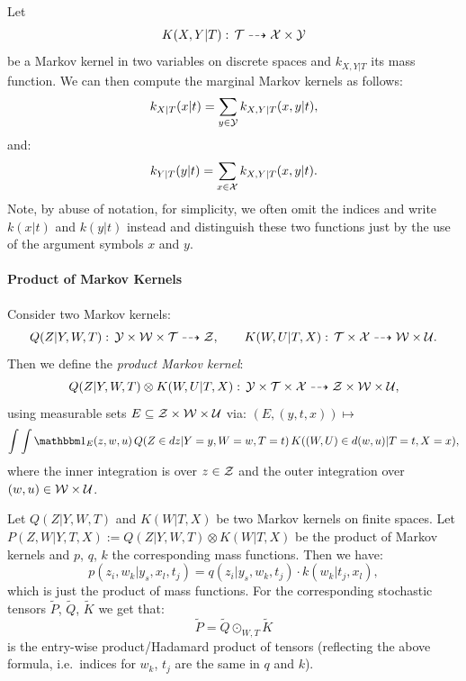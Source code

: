 \begin{Eg}
    Let 
    \[K(X,Y|T):\,\mathcal{T} \dashrightarrow  \mathcal{X} \times \mathcal{Y} \]
    be a Markov kernel in two variables on discrete spaces and $k_{X,Y|T}$ its mass function.
    We can then compute the marginal Markov kernels as follows:
    \[  k_{X|T}(x|t) = \sum_{y \in \mathcal{Y}} k_{X,Y|T}(x,y|t), \]
    and:
    \[  k_{Y|T}(y|t) = \sum_{x \in \mathcal{X}} k_{X,Y|T}(x,y|t). \]
    Note, by abuse of notation, for simplicity, we often omit the indices and write $k(x|t)$ and $k(y|t)$ instead 
    and distinguish these two functions just by the use of the argument symbols $x$ and $y$.
\end{Eg}


\paragraph{Product of Markov Kernels}

\begin{Def}
    \label{def-product-markov-kernels}
    Consider two Markov kernels:
    \[ Q(Z|Y,W,T):\, \mathcal{Y} \times \mathcal{W}\times \mathcal{T} \dashrightarrow \mathcal{Z},\qquad  
    K(W,U|T,X):\, \mathcal{T} \times \mathcal{X} \dashrightarrow \mathcal{W} \times \mathcal{U}. \]
    Then we define the \emph{product Markov kernel}:
    \[ Q(Z|Y,W,T) \otimes K(W,U|T,X) :\, \mathcal{Y} \times  \mathcal{T} \times \mathcal{X} \dashrightarrow \mathcal{Z} \times \mathcal{W} \times \mathcal{U}, \]
    using  measurable sets $E \subseteq \mathcal{Z} \times \mathcal{W} \times \mathcal{U}$ via: $(E,(y,t,x)) \mapsto $
    \[\int\int \I_E(z,w,u)\, Q(Z \in dz|Y=y,W=w,T=t) \, K((W,U) \in d(w,u)|T=t,X=x),\]
where the inner integration is over $z \in \mathcal{Z}$ and the outer integration over $(w,u) \in \mathcal{W}\times \mathcal{U}$.
\end{Def}

\begin{Eg}
    Let $Q(Z|Y,W,T)$ and $K(W|T,X)$ be two Markov kernels on finite spaces.
    Let $P(Z,W|Y,T,X) := Q(Z|Y,W,T) \otimes K(W|T,X)$ be the product of Markov kernels and $p$, $q$, $k$ the corresponding mass functions.
    Then we have:
    \[  p(z_i,w_k|y_s,x_l,t_j) = q(z_i|y_s,w_k,t_j) \cdot k(w_k|t_j,x_l),  \]
    which is just the product of mass functions.
    For the corresponding stochastic tensors $\tilde P$, $\tilde Q$, $\tilde K$ we get that:    
    \[\tilde P = \tilde Q \odot_{W,T} \tilde K\]
    is the entry-wise product/Hadamard product of tensors (reflecting the above formula, i.e.\ indices for $w_k$, $t_j$  are the same in $q$ and $k$).
\end{Eg}

